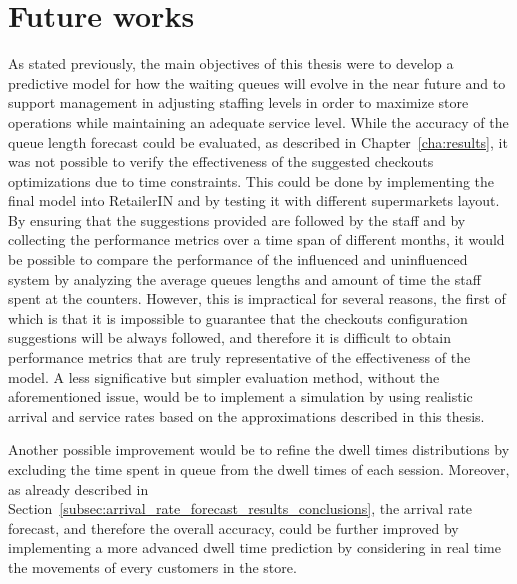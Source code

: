 \section{Future works}
\label{sec:future_works}

As stated previously, the main objectives of this thesis were to develop a predictive model for how the waiting queues will evolve in the near future and to support management in adjusting staffing levels in order to maximize store operations while maintaining an adequate service level. While the accuracy of the queue length forecast could be evaluated, as described in Chapter~\ref{cha:results}, it was not possible to verify the effectiveness of the suggested checkouts optimizations due to time constraints. This could be done by implementing the final model into RetailerIN and by testing it with different supermarkets layout. By ensuring that the suggestions provided are followed by the staff and by collecting the performance metrics over a time span of different months, it would be possible to compare the performance of the influenced and uninfluenced system by analyzing the average queues lengths and amount of time the staff spent at the counters. However, this is impractical for several reasons, the first of which is that it is impossible to guarantee that the checkouts configuration suggestions will be always followed, and therefore it is difficult to obtain performance metrics that are  truly representative of the effectiveness of the model. A less significative but simpler evaluation method, without the aforementioned issue, would be to implement a simulation by using realistic arrival and service rates based on the approximations described in this thesis.

Another possible improvement would be to refine the dwell times distributions by excluding the time spent in queue from the dwell times of each session. Moreover, as already described in Section~\ref{subsec:arrival_rate_forecast_results_conclusions}, the arrival rate forecast, and therefore the overall accuracy, could be further improved by implementing a more advanced dwell time prediction by considering in real time the movements of every customers in the store.

\clearpage


